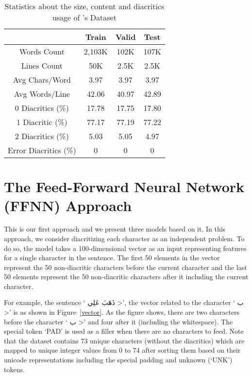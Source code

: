 \documentclass[11pt,a4paper]{article}
\begin{document}
\begin{table}
\centering
\caption{Statistics about the size, content and diacritics usage
of \cite{dataset}'s Dataset}
\label{tab:dataset}
\begin{tabular}{c|c|c|c|}
\cline{2-4}
\multicolumn{1}{l|}{}                   & Train & Valid & Test \\ \hline
\multicolumn{1}{|c|}{Words Count}       & 2,103K   & 102K  & 107K    \\ \hline
\multicolumn{1}{|c|}{Lines Count}       & 50K      & 2.5K  & 2.5K    \\ \hline
\multicolumn{1}{|c|}{Avg Chars/Word}    & 3.97     & 3.97  & 3.97    \\ \hline
\multicolumn{1}{|c|}{Avg Words/Line}    & 42.06    & 40.97 & 42.89   \\ \hline
\multicolumn{1}{|c|}{0 Diacritics (\%)} & 17.78    & 17.75 & 17.80   \\ \hline
\multicolumn{1}{|c|}{1 Diacritic (\%)}  & 77.17    & 77.19 & 77.22   \\ \hline
\multicolumn{1}{|c|}{2 Diacritics (\%)} & 5.03     & 5.05  & 4.97    \\ \hline
\multicolumn{1}{|c|}{Error Diacritics (\%)} & 0 & 0 & 0              \\ \hline
\end{tabular}
\end{table}


\section{The Feed-Forward Neural Network (FFNN) Approach}
\label{sec:ffnn}

This is our first approach and we present three models based on it.
In this approach, we consider diacritizing each character as an independent problem. To do so, the model takes a 100-dimensional vector as an input representing features for a single character in the sentence. The first 50 elements in the vector represent the 50 non-diacritic characters before the current character and the last 50 elements represent the 50 non-diacritic characters after it including the current character.

For example, the sentence `\<
ذَهَبَ عَلِي
>', the vector related to the character
`\<
ب
>'
is as shown in Figure~\ref{vector}.
As the figure shows,
there are two characters before the character
`\<
ب
>'
and four after it (including the whitespace). The special token `PAD' is used as a filler when there are no characters to feed. Note that the dataset contains 73 unique characters (without the diacritics) which are mapped to unique integer values from 0 to 74 after sorting them based on their unicode representations including the special padding and unknown (`UNK') tokens.
\end{document}

